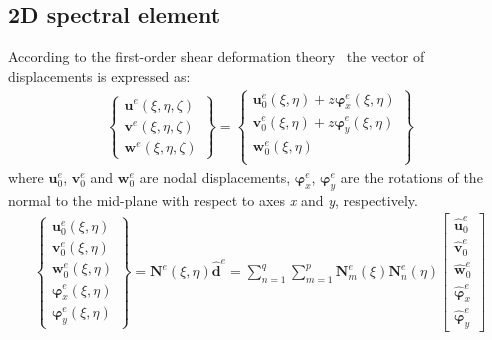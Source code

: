 \documentclass[a4paper,fleqn]{cas-sc}
\begin{document}
\subsection{2D spectral element}
\label{sec:2D_SEM}

According to the first-order shear deformation theory~\cite{reissner1945effect, mindlin1951influence} the vector of displacements is expressed as:
\begin{eqnarray}
	\left \{ \begin{array}{c}
		\textbf{u}^e(\xi,\eta,\zeta) \\
		\textbf{v}^e(\xi,\eta,\zeta) \\
		\textbf{w}^e(\xi,\eta,\zeta)
	\end{array} \right\} = 
	\left \{ \begin{array}{c}
		\textbf{u}_0^e(\xi,\eta) + z\boldsymbol{\varphi}_x^e(\xi,\eta)\\
		\textbf{v}_0^e(\xi,\eta) + z\boldsymbol{\varphi}_y^e(\xi,\eta)\\
		\textbf{w}_0^e(\xi,\eta) \\
	\end{array} \right\}
\end{eqnarray}
where \(\textbf{u}_0^e\), \(\textbf{v}_0^e\) and \(\textbf{w}_0^e\) are nodal displacements, \(\boldsymbol{\varphi}_x^e\), \(\boldsymbol{\varphi}_y^e\) are the rotations of the normal to the mid-plane with respect to axes \textit{x} and \textit{y}, respectively.
\begin{eqnarray}
	\left \{\begin{array}{c}
		\textbf{u}_0^e(\xi,\eta) \\
		\textbf{v}_0^e(\xi,\eta) \\
		\textbf{w}_0^e(\xi,\eta) \\
		\boldsymbol{\varphi}_x^e(\xi,\eta) \\
		\boldsymbol{\varphi}_y^e(\xi,\eta)
	\end{array} \right\} 
	 = \textbf{N}^e(\xi,\eta)\widehat{\textbf{d}}^e
	 = \sum_{n=1}^q\sum_{m=1}^p\textbf{N}_m^e(\xi)\textbf{N}_n^e(\eta)
	\left [ \begin{array}{c}
		\widehat{\textbf{u}}_0^e \\
		\widehat{\textbf{v}}_0^e \\
		\widehat{\textbf{w}}_0^e \\
		\widehat{\boldsymbol{\varphi}}_x^e \\
		\widehat{\boldsymbol{\varphi}}_y^e
	\end{array} \right]
\end{eqnarray}
\end{document}
